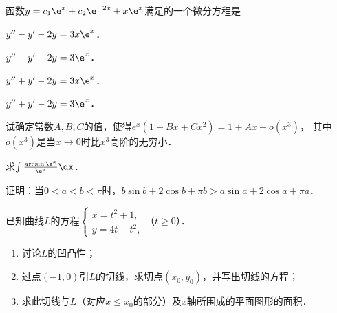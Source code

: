 \documentclass[plain,noanswer,medmath]{../../template/jnuexam}
\begin{document}
\begin{problem}
函数$y = c_1\e^x + c_2\e^{- 2x} + x\e^x$满足的一个微分方程是\pickout{}
\begin{abcd}
\item $y'' - y' - 2y = 3x\e^x$．
\item $y'' - y' - 2y = 3\e^x$．
\item $y'' + y' - 2y = 3x\e^x$．
\item $y'' + y' - 2y = 3\e^x$．
\end{abcd}
\end{problem}












\begin{problem}[points=10]
试确定常数$A,B,C$的值，使得$e^x(1 + Bx + Cx^2) = 1 + Ax + o(x^3)$，
其中$o(x^3)$是当$x \to 0$时比$x^3$高阶的无穷小．
\end{problem}


\begin{problem}[points=10]
求$\int \frac{\arcsin \e^x}{\e^x}\dx$．
\end{problem}






\begin{problem}[points=10]
证明：当$0 < a < b < \pi$时，$b\sin b + 2\cos b + \pi b > a\sin a + 2\cos a + \pi a$．
\end{problem}




\begin{problem}[points=12]
已知曲线$L$的方程$\begin{cases}
  x = t^2 + 1, \\
  y = 4t - t^2,
\end{cases}$（$t \ge 0$）．
\begin{enumerate}
\item 讨论$L$的凹凸性；
\item 过点$(-1,0)$引$L$的切线，求切点$(x_0,y_0)$，并写出切线的方程；
\item 求此切线与$L$（对应$x \le x_0$的部分）及$x$轴所围成的平面图形的面积．
\end{enumerate}
\end{problem}




\end{document}
